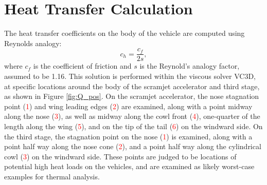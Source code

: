 \section{Heat Transfer Calculation}
The heat transfer coefficients on the body of the vehicle are computed using Reynolds analogy: 
\begin{equation}
c_h = \frac{c_f}{2s},
\end{equation}
where $c_f$ is the coefficient of friction and $s$ is the Reynold's analogy factor, assumed to be 1.16\cite{Ward2018}. 
This solution is performed within the viscous solver VC3D, at specific locations around the body of the scramjet accelerator and third stage, as shown in Figure \ref{fig:Q_pos}. On the scramjet accelerator, the nose stagnation point (\textcolor{red}{1}) and wing leading edges (\textcolor{red}{2}) are examined, along with a point midway along the nose (\textcolor{red}{3}), as well as midway along the cowl front (\textcolor{red}{4}), one-quarter of the length along the wing (\textcolor{red}{5}), and on the tip of the tail (\textcolor{red}{6}) on the windward side. On the third stage, the stagnation point on the nose (\textcolor{red}{1}) is examined, along with a point half way along the nose cone (\textcolor{red}{2}), and a point half way along the cylindrical cowl (\textcolor{red}{3}) on the windward side. These points are judged to be locations of potential high heat loads on the vehicles, and are examined as likely worst-case examples for thermal analysis. 

